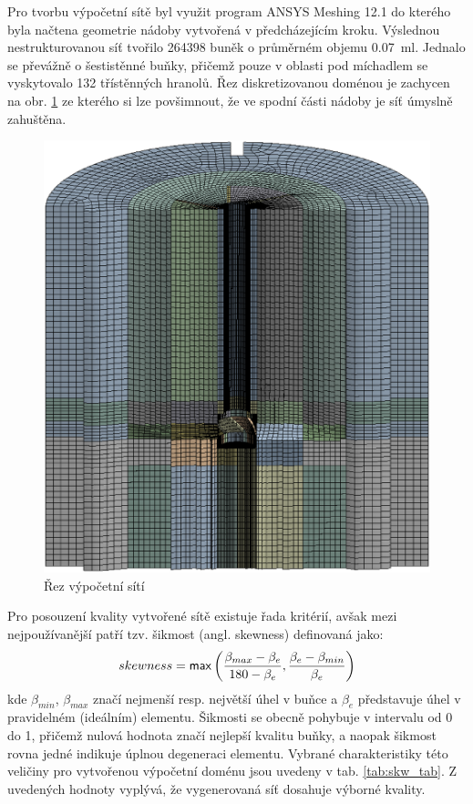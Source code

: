 Pro tvorbu výpočetní sítě byl využit program ANSYS Meshing 12.1 do kterého byla načtena geometrie nádoby vytvořená v předcházejícím kroku. Výslednou nestrukturovanou síť tvořilo \num{264398} buněk o průměrném objemu \SI{0.07}{\milli\litre}. Jednalo se převážně o šestistěnné buňky, přičemž pouze v oblasti pod míchadlem se vyskytovalo \num{132} třístěnných hranolů. Řez diskretizovanou doménou je zachycen na obr. \ref{fig:mesh} ze kterého si lze povšimnout, že ve spodní části nádoby je síť úmyslně zahuštěna. 
\begin{figure}[t]
\centering
\includegraphics[scale=0.28]{images/mesh.eps}
\caption{Řez výpočetní sítí}
\label{fig:mesh}
\end{figure} 
Pro posouzení kvality vytvořené sítě existuje řada kritérií, avšak mezi nejpoužívanější patří tzv. šikmost (angl. skewness) definovaná jako:
\begin{equation}
      skewness = \mathsf{max}\left( \frac{\beta_{max} - \beta_{e}}{180 - \beta_{e}}, \frac{\beta_{e} - \beta_{min}}{\beta_{e}} \right)
  	\label{eq:skw}
\end{equation} 
kde $\beta_{min}$, $\beta_{max}$ značí nejmenší resp. největší úhel v buňce a $\beta_{e}$ představuje úhel v pravidelném (ideálním) elementu. Šikmosti se obecně pohybuje v intervalu od \num{0} do \num{1}, přičemž nulová hodnota značí nejlepší kvalitu buňky, a naopak šikmost rovna jedné indikuje úplnou degeneraci elementu. Vybrané charakteristiky této veličiny pro vytvořenou výpočetní doménu jsou uvedeny v tab. \ref{tab:skw_tab}. Z uvedených hodnoty vyplývá, že vygenerovaná síť dosahuje výborné kvality.
